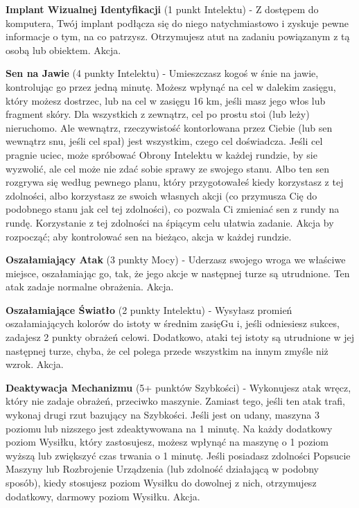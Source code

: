 {\textbf{Implant Wizualnej Identyfikacji} (1 punkt Intelektu) - Z dostępem do komputera, Twój implant podłącza się do niego natychmiastowo i zyskuje pewne informacje o tym, na co patrzysz. Otrzymujesz atut na zadaniu powiązanym z tą osobą lub obiektem. Akcja.

\textbf{Sen na Jawie}\label{sec:Sen na Jawie} (4 punkty Intelektu) - Umieszczasz kogoś w śnie na jawie, kontrolując go przez jedną minutę. Możesz wpłynąć na cel w dalekim zasięgu, który możesz dostrzec, lub na cel w zasięgu 16 km, jeśli masz jego włos lub fragment skóry. Dla wszystkich z zewnątrz, cel po prostu stoi (lub leży) nieruchomo.  Ale wewnątrz, rzeczywistość kontorlowana przez Ciebie (lub sen wewnątrz snu, jeśli cel spał) jest wszystkim, czego cel doświadcza. Jeśli cel pragnie uciec, może spróbować Obrony Intelektu w każdej rundzie, by sie wyzwolić, ale cel może nie zdać sobie sprawy ze swojego stanu. Albo ten sen rozgrywa się według pewnego planu, który przygotowałeś kiedy korzystasz z tej zdolności, albo korzystasz ze swoich własnych akcji (co przymusza Cię do podobnego stanu jak cel tej zdolności), co pozwala Ci zmieniać sen z rundy na rundę. Korzystanie z tej zdolności na śpiącym celu ułatwia zadanie. Akcja by rozpocząć; aby kontrolować sen na bieżąco, akcja w każdej rundzie. 

\textbf{Oszałamiający Atak}\label{sec:Oszałamiający Atak} (3 punkty Mocy) - Uderzasz swojego wroga we właściwe miejsce, oszałamiając go, tak, że jego akcje w następnej turze są utrudnione. Ten atak zadaje normalne obrażenia. Akcja. 

\textbf{Oszałamiające Światło}\label{sec:Oszałamiające Światło} (2 punkty Intelektu) - Wysyłasz promień oszałamiających kolorów do istoty w średnim zasięGu i, jeśli odniesiesz sukces, zadajesz 2 punkty obrażeń celowi. Dodatkowo, ataki tej istoty są utrudnione w jej następnej turze, chyba, że cel polega przede wszystkim na innym zmyśle niż wzrok. Akcja.

\textbf{Deaktywacja Mechanizmu}\label{sec:Deaktywacja Mechanizmu} (5+ punktów Szybkości) - Wykonujesz atak wręcz, który nie zadaje obrażeń, przeciwko maszynie. Zamiast tego, jeśli ten atak trafi, wykonaj drugi rzut bazujący na Szybkości. Jeśli jest on udany, maszyna 3 poziomu lub nizszego jest zdeaktywowana na 1 minutę. Na każdy dodatkowy poziom Wysiłku, który zastosujesz, możesz wpłynąć na maszynę o 1 poziom wyższą lub zwiększyć czas trwania o 1 minutę. Jeśli posiadasz zdolności Popsucie Maszyny lub Rozbrojenie Urządzenia (lub zdolność działającą w podobny sposób), kiedy stosujesz poziom Wysiłku do dowolnej z nich, otrzymujesz dodatkowy, darmowy poziom Wysiłku. Akcja.

}
